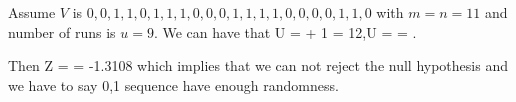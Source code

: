\begin{example}
Assume $V$ is $0,0,1,1,0,1,1,1,0,0,0,1,1,1,1,0,0,0,0,1,1,0$ with $m=n=11$ and number of runs is $u = 9$. We can have that 
\be
\E U =  + 1 = 12,\quad \var U =  = .
\ee

Then
\be
Z =  = -1.3108
\ee
which implies that we can not reject the null hypothesis and we have to say 0,1 sequence have enough randomness.
\end{example}







